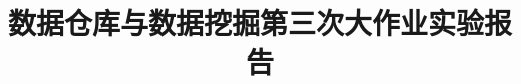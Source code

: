 \documentclass{acm_proc_article-sp}
\begin{document}
\title{\textsf{ 数据仓库与数据挖掘第三次大作业实验报告}}
%
%
%
%
%
\end{document}
